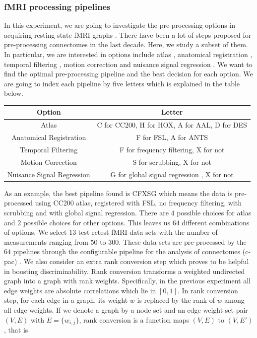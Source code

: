 \documentclass{article}
\begin{document}
\subsubsection{fMRI processing pipelines}
In this experiment, we are going to investigate the pre-processing options in acquiring resting state fMRI graphs \cite{huettel2004functional}. There have been a lot of steps proposed for pre-processing connectomes in the last decade. Here, we study a subset of them. In particular, we are interested in options include atlas \cite{mai2015atlas}, anatomical registration \cite{klein2009evaluation}, temporal filtering \cite{smith1999investigation}, motion correction \cite{power2012spurious} and nuisance signal regression \cite{fox2009global}. We want to find the optimal pre-processing pipeline and the best decision for each option. We are going to index each pipeline by five letters which is explained in the table below.   
\begin{center}
	\begin{tabular}{ |c|c| } 
		\hline
		Option & Letter  \\ \hline
		Atlas & C for CC200, H for HOX, A for AAL, D for DES \cite{craddock2012whole,desikan2006automated} \\ \hline
		Anatomical Registration & F for FSL, A for ANTS \cite{andersson2007non,avants2009advanced}\\ \hline
		Temporal Filtering & F for frequency filtering, X for not  \cite{smith1999investigation}\\ \hline
		Motion Correction & S for scrubbing, X for not  \cite{power2012spurious} \\ \hline
		Nuisance Signal Regression & G for global signal regression , X for not \cite{fox2009global} \\ \hline
	\end{tabular}
\end{center}
As an example, the best pipeline found is CFXSG which means the data is pre-processed using CC200 atlas, registered with FSL, no frequency filtering, with scrubbing and with global signal regression. There are $4$ possible choices for atlas and $2$ possible choices for other options. This leaves us $64$ different combinations of options. We select $13$ test-retest fMRI data sets with the number of measurements ranging from $50$ to $300$. These data sets are pre-processed by the $64$ pipelines through the configurable pipeline for the analysis of connectomes (c-pac) \cite{sikka2014towards}. We also consider an extra rank conversion step which proves to be helpful in boosting discriminability. Rank conversion transforms a weighted undirected graph into a graph with rank weights. Specifically, in the previous experiment all edge weights are absolute correlations which lie in $[0,1]$. In rank conversion step, for each edge in a graph, its weight $w$ is replaced by the rank of $w$ among all edge weights. If we denote a graph by a node set and an edge weight set pair $(V,E)$ with $E=\{w_{i,j}\}$, rank conversion is a function maps $(V,E)$ to $(V,E')$, that is
\end{document}
